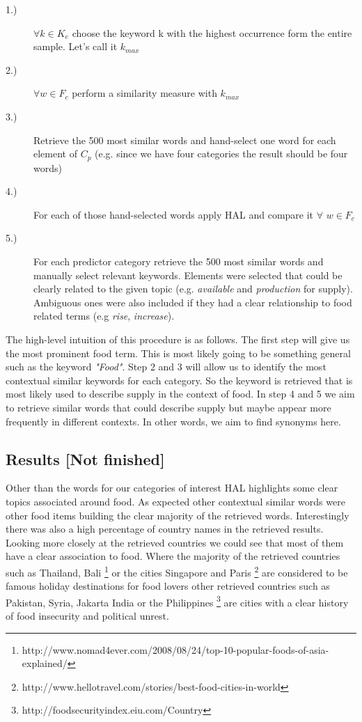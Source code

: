 \documentclass[12pt]{report}
\begin{document}
\begin{description}
  \item[1.)] $\forall k \in K_e$ choose the keyword k with the highest occurrence form the entire sample. Let's call it $k_{max}$  
  \item[2.)] $\forall w \in F_c $ perform a similarity measure with $k_{max}$
  \item[3.)] Retrieve the 500 most similar words and hand-select one word for each element of $C_p$ (e.g. since we have four categories the result should be four words)
  \item[4.)] For each of those hand-selected words  apply HAL and compare it $\forall$ $w \in F_c $
  \item[5.)] For each predictor category retrieve the 500 most similar words and manually select relevant keywords. Elements were selected that could be clearly related to the given topic (e.g. \emph{available} and \emph {production} for supply). Ambiguous ones were also included if they had a clear relationship to food related terms (e.g \emph{rise}, \emph {increase}).
  \end{description}

The high-level intuition of this procedure is as follows. The first step will give us the most prominent food term. This is most likely going to be something general such as the keyword \emph{"Food"}. Step 2 and 3 will allow us to identify the most contextual similar keywords for each category. So the keyword is retrieved that is most likely used to describe supply in the context of food. In step 4 and 5 we aim to retrieve similar words that could describe supply but maybe appear more frequently in different contexts. In other words, we aim to find synonyms here.   

\subsection{Results [Not finished] }

Other than the words for our categories of interest HAL highlights some clear topics associated around food. As expected other contextual similar words were other food items building the clear majority of the retrieved words. Interestingly there was also a high percentage of country names in the retrieved results. Looking more closely at the retrieved countries we could see that most of them have a clear association to food. Where the majority of the retrieved countries such as Thailand, Bali \footnote{http://www.nomad4ever.com/2008/08/24/top-10-popular-foods-of-asia-explained/} or the cities Singapore and Paris \footnote{http://www.hellotravel.com/stories/best-food-cities-in-world} are considered to be famous holiday destinations for food lovers other retrieved countries such as Pakistan, Syria, Jakarta India or the Philippines \footnote{http://foodsecurityindex.eiu.com/Country} are cities with a clear history of food insecurity and political unrest. 
\end{document}
